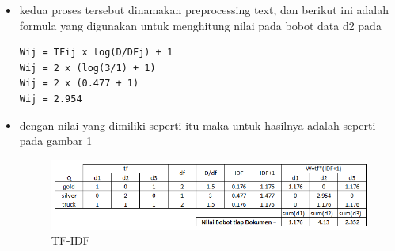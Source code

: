 \begin{enumerate}
\begin{itemize}
\item kedua proses tersebut dinamakan preprocessing text, dan berikut ini adalah formula yang digunakan untuk menghitung nilai pada bobot data d2 pada
\begin{verbatim}
Wij = TFij x log(D/DFj) + 1
Wij = 2 x (log(3/1) + 1)
Wij = 2 x (0.477 + 1)
Wij = 2.954
\end{verbatim}

\item dengan nilai yang dimiliki seperti itu maka untuk hasilnya adalah seperti pada gambar \ref{coba5}
\begin{figure}[!htbp]
	\centering
	\includegraphics[width=1\textwidth]{figures/fathi/chapter4/hari1/5}
	\caption{TF-IDF}
	\label{coba5}
\end{figure}
\end{itemize}
\end{enumerate}